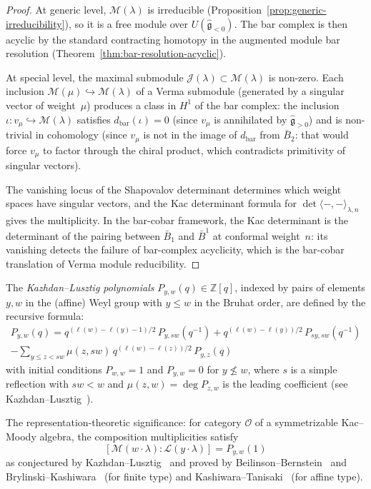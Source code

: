 \begin{proof}
At generic level, $\mathcal{M}(\lambda)$ is irreducible
(Proposition~\ref{prop:generic-irreducibility}), so it is a free
module over $U(\widehat{\mathfrak{g}}_{<0})$. The bar complex is
then acyclic by the standard contracting homotopy in the augmented
module bar resolution
(Theorem~\ref{thm:bar-resolution-acyclic}).

At special level, the maximal submodule
$\mathcal{J}(\lambda) \subset \mathcal{M}(\lambda)$ is non-zero.
Each inclusion $\mathcal{M}(\mu) \hookrightarrow \mathcal{M}(\lambda)$
of a Verma submodule (generated by a singular vector of weight~$\mu$)
produces a class in $H^1$ of the bar complex: the inclusion
$\iota: v_\mu \hookrightarrow \mathcal{M}(\lambda)$ satisfies
$d_{\mathrm{bar}}(\iota) = 0$ (since $v_\mu$ is annihilated by
$\widehat{\mathfrak{g}}_{>0}$) and is non-trivial in cohomology
(since $v_\mu$ is not in the image of $d_{\mathrm{bar}}$ from
$\bar{B}_2$: that would force $v_\mu$ to factor through the
chiral product, which contradicts primitivity of singular vectors).

The vanishing locus of the Shapovalov determinant determines which
weight spaces have singular vectors, and the Kac determinant formula
\cite{Kac,KR87} for
$\det \langle -, - \rangle_{\lambda, n}$ gives the multiplicity.
In the bar-cobar framework, the Kac determinant is the determinant
of the pairing between $\bar{B}_1$ and $\bar{B}^1$ at conformal
weight~$n$: its vanishing detects the failure of bar-complex
acyclicity, which is the bar-cobar translation of Verma module
reducibility.
\end{proof}

\begin{definition}
\label{def:kl-polynomials}
The \emph{Kazhdan--Lusztig polynomials}
$P_{y,w}(q) \in \mathbb{Z}[q]$, indexed by pairs of elements
$y, w$ in the (affine) Weyl group with $y \leq w$ in the Bruhat
order, are defined by the recursive formula:
\begin{multline*}
P_{y,w}(q) = q^{(\ell(w) - \ell(y) - 1)/2}\,
P_{y,sw}(q^{-1})
+ q^{(\ell(w) - \ell(y))/2}\, P_{sy,sw}(q^{-1}) \\
- \sum_{y \leq z < sw} \mu(z, sw)\, q^{(\ell(w) - \ell(z))/2}\, P_{y,z}(q)
\end{multline*}
with initial conditions $P_{w,w} = 1$ and $P_{y,w} = 0$ for
$y \not\leq w$, where $s$ is a simple reflection with $sw < w$
and $\mu(z,w) = \deg P_{z,w}$ is the leading coefficient
(see Kazhdan--Lusztig~\cite{KL79}).

The representation-theoretic significance: for category
$\mathcal{O}$ of a symmetrizable Kac--Moody algebra,
the composition multiplicities satisfy
\begin{equation}\label{eq:kl-multiplicity}
[\mathcal{M}(w \cdot \lambda) : \mathcal{L}(y \cdot \lambda)]
= P_{y,w}(1)
\end{equation}
as conjectured by Kazhdan--Lusztig~\cite{KL79} and proved by
Beilinson--Bernstein~\cite{BB81} and Brylinski--Kashiwara~\cite{BK81}
(for finite type) and Kashiwara--Tanisaki~\cite{KT95} (for affine type).
\end{definition}

